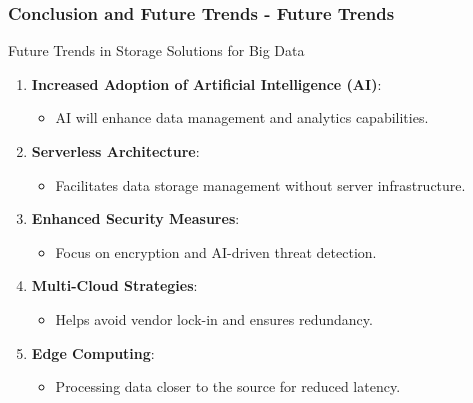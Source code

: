 \documentclass[aspectratio=169]{beamer}
\begin{document}
\begin{frame}[fragile]
    \frametitle{Conclusion and Future Trends - Future Trends}
    \begin{block}{Future Trends in Storage Solutions for Big Data}
        \begin{enumerate}
            \item \textbf{Increased Adoption of Artificial Intelligence (AI)}:
                \begin{itemize}
                    \item AI will enhance data management and analytics capabilities.
                \end{itemize}
            \item \textbf{Serverless Architecture}:
                \begin{itemize}
                    \item Facilitates data storage management without server infrastructure.
                \end{itemize}
            \item \textbf{Enhanced Security Measures}:
                \begin{itemize}
                    \item Focus on encryption and AI-driven threat detection.
                \end{itemize}
            \item \textbf{Multi-Cloud Strategies}:
                \begin{itemize}
                    \item Helps avoid vendor lock-in and ensures redundancy.
                \end{itemize}
            \item \textbf{Edge Computing}:
                \begin{itemize}
                    \item Processing data closer to the source for reduced latency.
                \end{itemize}
        \end{enumerate}
    \end{block}
\end{frame}
\end{document}
